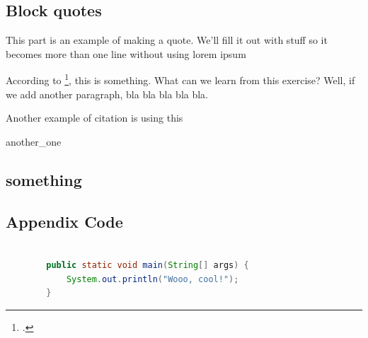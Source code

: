 \documentclass[oneside,12pt]{book}
\renewenvironment{quote}{%
	\list{}{%
		\leftmargin0.5in   %
		\rightmargin0cm
	}
	\item\relax
}
{\endlist}
\begin{document}
\begin{doublespace}
\section{Block quotes}
This part is an example of making a quote. We'll fill it out with stuff so it becomes more than one line without using lorem ipsum
\begin{quote}
	\lipsum[1-2] \parencite{wombat2016} %
\end{quote}

According to \footcite[Quote from][According to me, this is really neat]{lion2010}, this is something. What can we learn from this exercise? Well, if we add another paragraph, bla bla bla bla bla.

Another example of citation is using this \parencite[see][page 12]{wikibook}






{another_one} %


\end{doublespace}



\backmatter

\printbibliography[heading=bibintoc]


\begin{appendices}
	\chapter{something}

	\section{Appendix Code}
	\begin{lstlisting}[language=java, style=skripsilisting]

		public static void main(String[] args) {
			System.out.println("Wooo, cool!");
		}
	\end{lstlisting}

\end{appendices}
\end{document}
